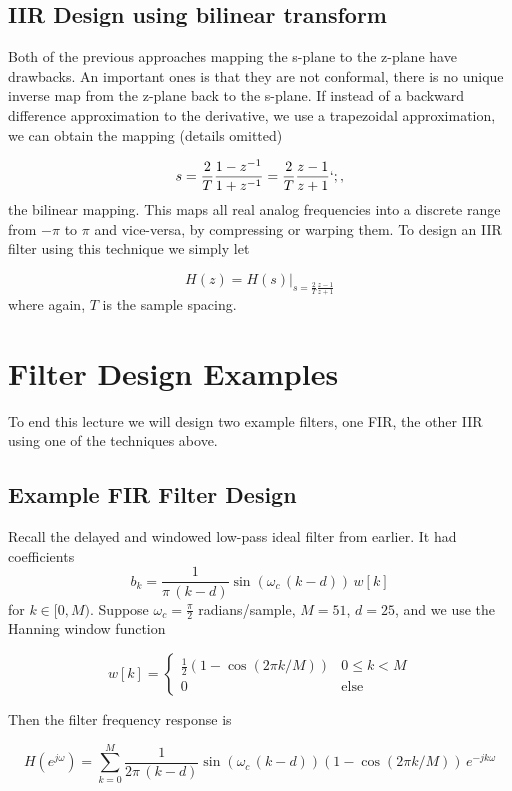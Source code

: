 \documentclass{article}
\begin{document}
\subsection{IIR Design using bilinear transform}

Both of the previous approaches mapping the s-plane to the z-plane have drawbacks. An important ones is that they are not conformal, there is no unique inverse map from the z-plane back to the s-plane. If instead of a backward difference approximation to the derivative, we use a trapezoidal approximation, we can obtain the mapping (details omitted)

\[
s = \frac{2}{T}\frac{1-z^{-1}}{1+z^{-1}} = \frac{2}{T}\frac{z-1}{z+1}`; ,
\]
the bilinear mapping. This maps all real analog frequencies into a discrete range from $-\pi$ to $\pi$ and vice-versa, by compressing or warping them. To design an IIR filter using this technique we simply let

\[
H(z) = \left. H(s) \right|_{s = \frac{2}{T}\frac{z-1}{z+1}}
\]
where again, $T$ is the sample spacing.

\section{Filter Design Examples}

To end this lecture we will design two example filters, one FIR, the other IIR using one of the techniques above. 

\subsection{Example FIR Filter Design}

Recall the delayed and windowed low-pass ideal filter from earlier. It had coefficients
\[
b_k = \frac{1}{\pi\, (k-d)} \sin(\omega_c\, (k-d))\, w[k]
\]
for $k\in [0,M)$. Suppose $\omega_c = \frac{\pi}{2}$ radians/sample, $M = 51$, $d = 25$, and we use the Hanning window function

\[
w[k] = \left\{ \begin{array}{cc}
  \frac{1}{2}\left(1 - \cos(2\pi k/M)\right) & 0 \leq k < M\\
  0 & \mbox{else}
  \end{array}\right. 
\]

Then the filter frequency response is

\[
H\left(e^{j\omega} \right) = \sum\limits_{k=0}^{M} \frac{1}{2\pi\, (k-d)} \sin(\omega_c\, (k-d))\left(1 - \cos(2\pi k/M)\right) \, e^{-jk\omega}
\]
\end{document}
